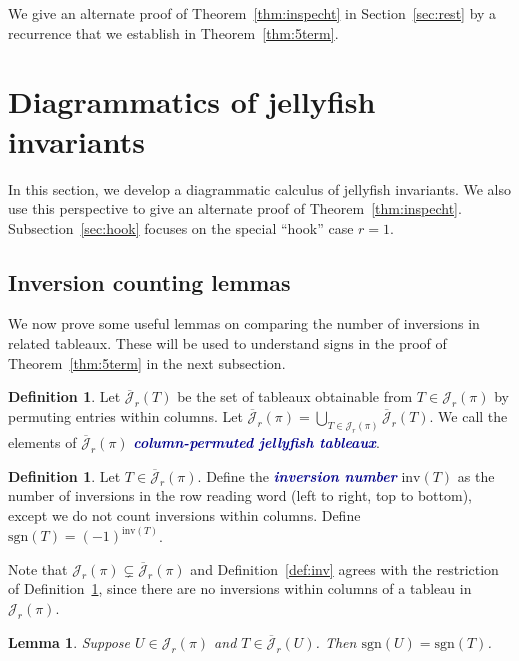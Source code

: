\documentclass[10pt]{amsart}
\theoremstyle{definition}
\newtheorem{definition}[cdrthm]{Definition}
\theoremstyle{plain}
\newtheorem{lemma}[cdrthm]{Lemma}
\theoremstyle{plain}
\theoremstyle{definition}
\theoremstyle{remark}
\theoremstyle{plain}
\theoremstyle{plain}
\theoremstyle{plain}
\numberwithin{equation}{section}
\newcommand{\rstab}{\mathcal{J}}
\newcommand{\rstabgen}{\overline{\mathcal{J}}}
\newcommand{\inv}{\mathrm{inv}}
\newcommand{\sgn}{\mathrm{sgn}}
\newcommand{\newword}[1]{\textcolor{darkblue}{\textbf{\emph{#1}}}}
\begin{document}
We give an alternate proof of Theorem~\ref{thm:inspecht} in Section~\ref{sec:rest} by a recurrence that we establish in Theorem~\ref{thm:5term}.

\section{Diagrammatics of jellyfish invariants}\label{sec:diagrammatics}

In this section, we develop a diagrammatic calculus of jellyfish invariants. We also use this perspective to give an alternate proof of Theorem~\ref{thm:inspecht}. Subsection~\ref{sec:hook} focuses on the special ``hook'' case $r=1$.

\subsection{Inversion counting lemmas}
\label{sec:lemmas}

We now prove some useful lemmas on comparing the number of inversions in related tableaux. These will be used to understand signs in the proof of Theorem~\ref{thm:5term} in the next subsection.

\begin{definition}
Let $\rstabgen_r(T)$ be the set of tableaux obtainable from $T\in\rstab_r(\pi)$ by permuting entries within columns. Let $\rstabgen_r(\pi)=\displaystyle\bigcup_{T\in\rstab_r(\pi)}\rstabgen_r(T)$. We call the elements of $\rstabgen_r(\pi)$ \newword{column-permuted jellyfish tableaux}.
\end{definition}

\begin{definition}
\label{def:inv2}
Let $T\in \rstabgen_r(\pi)$. Define the \newword{inversion number} $\inv(T)$ as the number of inversions in the row reading word (left to right, top to bottom), except we do not count inversions within columns. Define $\sgn(T)=(-1)^{\inv(T)}$.
\end{definition}


Note that $\rstab_r(\pi) \subsetneq \rstabgen_r(\pi)$ and Definition~\ref{def:inv} agrees with the restriction of Definition~\ref{def:inv2}, since there are no inversions within columns of a tableau in $\rstab_r(\pi)$.


\begin{lemma}
\label{lem:row_col_swap}
Suppose $U\in \rstab_r(\pi)$ and $T\in \rstabgen_r(U)$. Then $\sgn(U)=\sgn(T)$.
\end{lemma}
\end{document}
